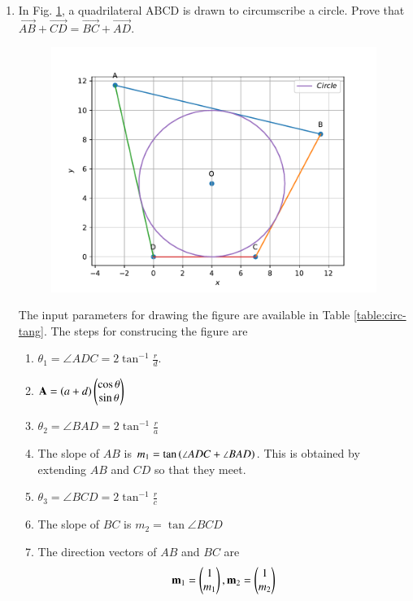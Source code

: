 \documentclass[journal,12pt,twocolumn]{IEEEtran}
\renewcommand\thesection{\arabic{section}}
\begin{document}
\begin{enumerate}[label=\thesection.\arabic*.,ref=\thesection.\theenumi]
    \item In Fig. 
	  \ref{fig:matrix-10-14.pdf},
a quadrilateral ABCD is drawn to circumscribe a circle. Prove that $\vec{AB} + \vec{CD} = \vec{BC} + \vec{AD}$.\\
  \begin{figure}
	  \centering 
	  \includegraphics[width=\columnwidth]{figs/matrix-10-14.pdf}
	  \caption{}
	  \label{fig:matrix-10-14.pdf}
	  \end{figure}
	    \solution   The input parameters for drawing the figure are available in Table
\eqref{table:circ-tang}.  The steps for construcing the figure are 
\begin{enumerate}
	\item  $\theta_1 = \angle ADC = 2\tan ^{-1}\frac{r}{d}$. 
	\item $\mathbf{A} = \left(a+ d\right) \begin{pmatrix}\cos \theta \\ \sin \theta\end{pmatrix}$
	\item $\theta_2 = \angle BAD = 2 \tan ^{-1}\frac{r}{a}$
	\item The slope of $AB$ is $m_1 =   \tan\left(\angle ADC + \angle BAD\right)$.  This is obtained by extending $AB$ and $CD$ so that they meet.
	\item $\theta_3 = \angle BCD = 2 \tan^{-1}\frac{r}{c}$
	\item The slope of $BC$ is $m_2 = \tan \angle BCD$
	\item The direction vectors of $AB$ and $BC$ are
		\begin{align}
			\vec{m}_1 = \myvec{1 \\m_1},
			\vec{m}_2 = \myvec{1 \\m_2}

\end{align}
\end{enumerate}
\end{enumerate}
\end{document}
